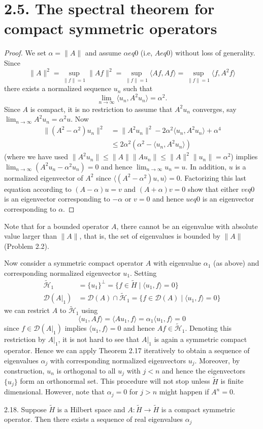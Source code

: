 \section*{2.5. The spectral theorem for compact symmetric operators}
\begin{proof}
We set $\alpha = \|A\|$ and assume $\alpha 
eq 0$ (i.e, $A 
eq 0$) without loss of
generality. Since
\[
\|A\|^2 = \sup_{\|f\|=1} \|Af\|^2 = \sup_{\|f\|=1} \langle Af, Af \rangle = \sup_{\|f\|=1} \langle f, A^2 f \rangle
\tag{2.44}
\]
there exists a normalized sequence $u_n$ such that
\[
\lim_{n\to\infty} \langle u_n, A^2 u_n \rangle = \alpha^2.
\tag{2.45}
\]
Since $A$ is compact, it is no restriction to assume that $A^2 u_n$ converges, say
$\lim_{n\to\infty} A^2 u_n = \alpha^2 u$. Now
\begin{align*}
\| (A^2 - \alpha^2)u_n \|^2 &= \| A^2 u_n\|^2 - 2\alpha^2 \langle u_n, A^2 u_n \rangle + \alpha^4 \\
&\leq 2\alpha^2(\alpha^2 - \langle u_n, A^2 u_n \rangle)
\tag{2.46}
\end{align*}
(where we have used $\| A^2 u_n\| \leq \|A\|\|A u_n\| \leq \|A\|^2\|u_n\| = \alpha^2$) implies
$\lim_{n\to\infty}(A^2 u_n - \alpha^2 u_n) = 0$ and hence $\lim_{n\to\infty} u_n = u$. In addition, $u$ is
a normalized eigenvector of $A^2$ since $\langle (A^2 - \alpha^2)u, u \rangle = 0$. Factorizing this last
equation according to $(A - \alpha)u = v$ and $(A + \alpha)v = 0$ show that either
$v 
eq 0$ is an eigenvector corresponding to $-\alpha$ or $v = 0$ and hence $u 
eq 0$ is an
eigenvector corresponding to $\alpha$.
\end{proof}
Note that for a bounded operator $A$, there cannot be an eigenvalue with
absolute value larger than $\|A\|$, that is, the set of eigenvalues is bounded by
$\|A\|$ (Problem 2.2).

Now consider a symmetric compact operator $A$ with eigenvalue $\alpha_1$ (as
above) and corresponding normalized eigenvector $u_1$. Setting
\begin{align*}
\tilde{\mathcal{H}}_1 &= \{u_1\}^\perp = \{f \in \tilde{H} \mid \langle u_1, f \rangle = 0\} \\
\mathcal{D}(A|_1) &= \mathcal{D}(A) \cap \tilde{\mathcal{H}}_1 = \{f \in \mathcal{D}(A) \mid \langle u_1, f \rangle = 0\}
\end{align*}
we can restrict $A$ to $\tilde{\mathcal{H}}_1$ using
\[
\langle u_1, Af \rangle = \langle Au_1, f \rangle = \alpha_1 \langle u_1, f \rangle = 0
\tag{2.47}
\]
since $f \in \mathcal{D}(A|_1)$ implies $\langle u_1, f \rangle = 0$ and hence $Af \in \tilde{\mathcal{H}}_1$. Denoting this restriction by $A|_1$, it is not hard to
see that $A|_1$ is again a symmetric compact operator. Hence we can apply
Theorem 2.17 iteratively to obtain a sequence of eigenvalues $\alpha_j$ with corresponding normalized eigenvectors $u_j$. Moreover, by construction, $u_n$ is
orthogonal to all $u_j$ with $j < n$ and hence the eigenvectors $\{u_j\}$ form an
orthonormal set. This procedure will not stop unless $\tilde{H}$ is finite dimensional.
However, note that $\alpha_j = 0$ for $j > n$ might happen if $A^n = 0$.

\begin{theorem}{2.18.}
Suppose $\tilde{H}$ is a Hilbert space and $A : \tilde{H} \to \tilde{H}$ is a compact
symmetric operator. Then there exists a sequence of real eigenvalues $\alpha_j$
\end{theorem}